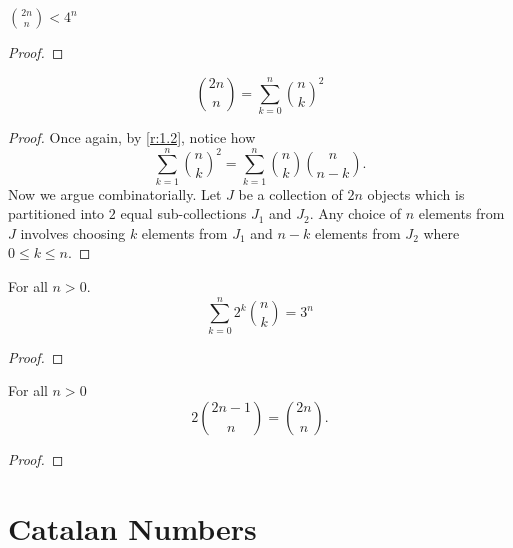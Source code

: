 \begin{claim}
$\binom{2n}{n}<4^n$
\end{claim}
\begin{proof}
    
\end{proof}

\begin{claim}
\[\binom{2n}{n} = \sum_{k=0}^{n} \binom{n}{k}^2\]
\end{claim}
\begin{proof}
Once again, by \cref{r:1.2}, notice how \[
\sum_{k=1}^n\binom{n}{k}^2 = \sum_{k=1}^{n}\binom{n}{k}\binom{n}{n-k}.
\] Now we argue combinatorially. Let $J$ be a collection of $2n$ objects which is partitioned into $2$ equal sub-collections $J_1$ and $J_2$. Any choice of $n$ elements from $J$ involves choosing $k$ elements from $J_1$ and $n-k$ elements from $J_2$ where $0\leq k\leq n$. 
\end{proof}
\begin{claim}
	For all $n>0$. \[
		\sum_{k=0}^{n} 2^k\binom{n}{k} = 3^n
	\]
\end{claim}
\begin{proof}
\end{proof}
\begin{claim}
For all $n>0$  \[
2\binom{2n-1}{n} = \binom{2n}{n}
.\] 
\end{claim}
\begin{proof}
\end{proof}
\section{Catalan Numbers}
\endinput
